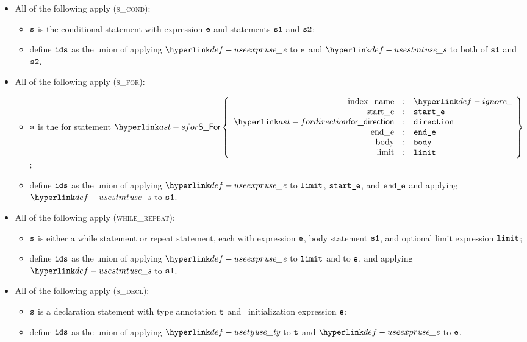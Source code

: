 \begin{itemize}
  \item All of the following apply (\textsc{s\_cond}):
  \begin{itemize}
    \item $\texttt{s}$ is the conditional statement with expression $\texttt{e}$ and statements $\texttt{s1}$ and $\texttt{s2}$;
    \item define $\texttt{ids}$ as the union of applying $\useexpr$ to $\texttt{e}$ and $\usestmt$ to both of $\texttt{s1}$ and $\texttt{s2}$.
  \end{itemize}

  \item All of the following apply (\textsc{s\_for}):
  \begin{itemize}
    \item $\texttt{s}$ is the for statement $\SFor\left\{\begin{array}{rcl}
      \Forindexname &:& \Ignore\\
      \Forstarte &:& \vstarte\\
      \fordirection &:& \vdirection\\
      \Forende &:& \vende\\
      \Forbody &:& \vbody\\
      \Forlimit &:& \vlimit
    \end{array}\right\}$;
    \item define $\texttt{ids}$ as the union of applying $\useexpr$ to $\texttt{limit}$, $\texttt{start\_e}$, and $\texttt{end\_e}$ and applying $\usestmt$ to $\texttt{s1}$.
  \end{itemize}

  \item All of the following apply (\textsc{while\_repeat}):
  \begin{itemize}
    \item $\texttt{s}$ is either a while statement or repeat statement, each with expression $\texttt{e}$, body statement $\texttt{s1}$,
          and optional limit expression $\texttt{limit}$;
    \item define $\texttt{ids}$ as the union of applying $\useexpr$ to $\texttt{limit}$ and to $\texttt{e}$, and applying $\usestmt$ to $\texttt{s1}$.
  \end{itemize}

  \item All of the following apply (\textsc{s\_decl}):
  \begin{itemize}
    \item $\texttt{s}$ is a declaration statement with \optional{} type annotation $\texttt{t}$ and \optional\ initialization expression $\texttt{e}$;
    \item define $\texttt{ids}$ as the union of applying $\usety$ to $\texttt{t}$ and $\useexpr$ to $\texttt{e}$.
  \end{itemize}


\end{itemize}
